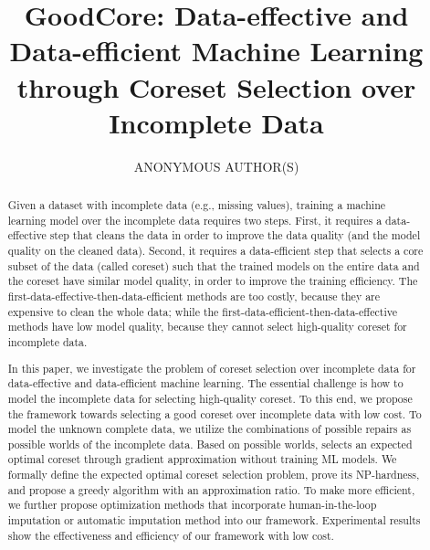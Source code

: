 \documentclass[acmsmall]{acmart}
\begin{document}
\title{GoodCore: Data-effective and Data-efficient Machine Learning through Coreset Selection over Incomplete Data}

\author{ANONYMOUS AUTHOR(S)}
\authorsaddresses{}


\begin{abstract}
Given a dataset with incomplete data (e.g., missing values), training a machine learning model over the incomplete data requires two steps. First,  it requires a data-effective step that cleans the data in order to improve the data quality (and the model quality on the cleaned data). Second, it requires a data-efficient step that selects a core subset of the data (called coreset) such that the trained models on the entire data and the coreset have similar model quality, in order to improve the training efficiency. The first-data-effective-then-data-efficient methods are too costly, because they are expensive to clean the whole data; while the first-data-efficient-then-data-effective methods have low model quality, because they cannot select high-quality coreset for incomplete data.
	
In this paper, we investigate the problem of coreset selection over incomplete data for data-effective and data-efficient machine learning. The essential challenge is how to model the incomplete data for selecting high-quality coreset.  To this end, we propose the \ours framework towards selecting a good coreset over incomplete data with low cost. To model the unknown complete data, we utilize the combinations of possible repairs as possible worlds of the incomplete data. 	Based on possible worlds, \ours  selects an expected optimal coreset through gradient approximation without training ML models. We formally define the expected optimal coreset selection problem, prove its NP-hardness, and propose a greedy algorithm with an approximation ratio. To make \ours more efficient, we further propose optimization methods that incorporate human-in-the-loop imputation or automatic imputation method into our framework. Experimental results show the effectiveness and efficiency of our framework with low cost.
\end{abstract}
\end{document}
